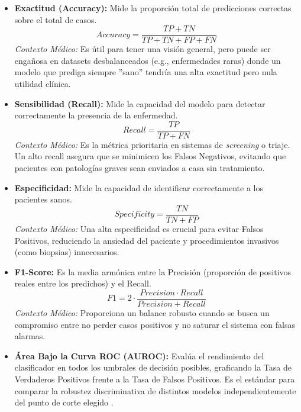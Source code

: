 \documentclass[11pt, a4paper]{article}
\begin{document}
\begin{itemize}
    \item \textbf{Exactitud (Accuracy):} Mide la proporción total de predicciones correctas sobre el total de casos.
    \begin{equation}
        Accuracy = \frac{TP + TN}{TP + TN + FP + FN}
    \end{equation}
    \textit{Contexto Médico:} Es útil para tener una visión general, pero puede ser engañosa en datasets desbalanceados (e.g., enfermedades raras) donde un modelo que prediga siempre ''sano'' tendría una alta exactitud pero nula utilidad clínica.

    \item \textbf{Sensibilidad (Recall):} Mide la capacidad del modelo para detectar correctamente la presencia de la enfermedad.
    \begin{equation}
        Recall = \frac{TP}{TP + FN}
    \end{equation}
    \textit{Contexto Médico:} Es la métrica prioritaria en sistemas de \textit{screening} o triaje. Un alto recall asegura que se minimicen los Falsos Negativos, evitando que pacientes con patologías graves sean enviados a casa sin tratamiento.

    \item \textbf{Especificidad:} Mide la capacidad de identificar correctamente a los pacientes sanos.
    \begin{equation}
        Specificity = \frac{TN}{TN + FP}
    \end{equation}
    \textit{Contexto Médico:} Una alta especificidad es crucial para evitar Falsos Positivos, reduciendo la ansiedad del paciente y procedimientos invasivos (como biopsias) innecesarios.

    \item \textbf{F1-Score:} Es la media armónica entre la Precisión (proporción de positivos reales entre los predichos) y el Recall.
    \begin{equation}
        F1 = 2 \cdot \frac{Precision \cdot Recall}{Precision + Recall}
    \end{equation}
    \textit{Contexto Médico:} Proporciona un balance robusto cuando se busca un compromiso entre no perder casos positivos y no saturar el sistema con falsas alarmas.

    \item \textbf{Área Bajo la Curva ROC (AUROC):} Evalúa el rendimiento del clasificador en todos los umbrales de decisión posibles, graficando la Tasa de Verdaderos Positivos frente a la Tasa de Falsos Positivos. Es el estándar para comparar
    la robustez discriminativa de distintos modelos independientemente del punto de corte elegido \cite{fawcett_introduction_2006}.
\end{itemize}
\end{document}
